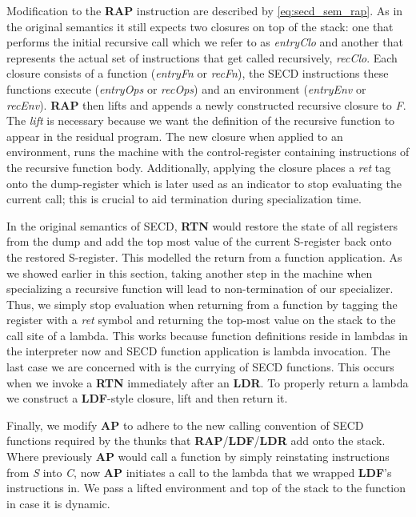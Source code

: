 \documentclass[a4paper,12pt,twoside,openright]{report}
\theoremstyle{definition}
\newcommand{\ts}{\textquotesingle}
\begin{document}
Modification to the \textbf{RAP} instruction are described by \eqref{eq:secd_sem_rap}. As in the original semantics it still expects two closures on top of the stack: one that performs the initial recursive call which we refer to as \textit{entryClo} and another that represents the actual set of instructions that get called recursively, \textit{recClo}. Each closure consists of a function (\textit{entryFn} or \textit{recFn}), the SECD instructions these functions execute (\textit{entryOps} or \textit{recOps}) and an environment (\textit{entryEnv} or \textit{recEnv}). \textbf{RAP} then lifts and appends a newly constructed recursive closure to \textit{F}. The \textit{lift} is necessary because we want the definition of the recursive function to appear in the residual program. The new closure when applied to an environment, runs the machine with the control-register containing instructions of the recursive function body. Additionally, applying the closure places a \textit{{\ts}ret} tag onto the dump-register which is later used as an indicator to stop evaluating the current call; this is crucial to aid termination during specialization time.

In the original semantics of SECD, \textbf{RTN} would restore the state of all registers from the dump and add the top most value of the current S-register back onto the restored S-register. This modelled the return from a function application. As we showed earlier in this section, taking another step in the machine when specializing a recursive function will lead to non-termination of our specializer. Thus, we simply stop evaluation when returning from a function by tagging the register with a \textit{{\ts}ret} symbol and returning the top-most value on the stack to the call site of a lambda. This works because function definitions reside in lambdas in the interpreter now and SECD function application is lambda invocation. The last case we are concerned with is the currying of SECD functions. This occurs when we invoke a \textbf{RTN} immediately after an \textbf{LDR}. To properly return a lambda we construct a \textbf{LDF}-style closure, lift and then return it.

Finally, we modify \textbf{AP} to adhere to the new calling convention of SECD functions required by the thunks that \textbf{RAP}/\textbf{LDF}/\textbf{LDR} add onto the stack. Where previously \textbf{AP} would call a function by simply reinstating instructions from \textit{S} into \textit{C}, now \textbf{AP} initiates a call to the lambda that we wrapped \textbf{LDF}'s instructions in. We pass a lifted environment and top of the stack to the function in case it is dynamic.
\end{document}
